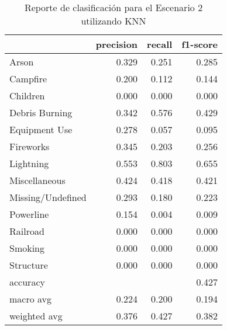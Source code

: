 \begin{table}
\centering
\caption{Reporte de clasificación para el Escenario 2 utilizando KNN}
\label{tab:KNN_Escenario 2}
\begin{tabular}{lrrr}
\toprule
{} &  precision &  recall &  f1-score \\
\midrule
Arson             &      0.329 &   0.251 &     0.285 \\
Campfire          &      0.200 &   0.112 &     0.144 \\
Children          &      0.000 &   0.000 &     0.000 \\
Debris Burning    &      0.342 &   0.576 &     0.429 \\
Equipment Use     &      0.278 &   0.057 &     0.095 \\
Fireworks         &      0.345 &   0.203 &     0.256 \\
Lightning         &      0.553 &   0.803 &     0.655 \\
Miscellaneous     &      0.424 &   0.418 &     0.421 \\
Missing/Undefined &      0.293 &   0.180 &     0.223 \\
Powerline         &      0.154 &   0.004 &     0.009 \\
Railroad          &      0.000 &   0.000 &     0.000 \\
Smoking           &      0.000 &   0.000 &     0.000 \\
Structure         &      0.000 &   0.000 &     0.000 \\
accuracy          &            &         &     0.427 \\
macro avg         &      0.224 &   0.200 &     0.194 \\
weighted avg      &      0.376 &   0.427 &     0.382 \\
\bottomrule
\end{tabular}
\end{table}
